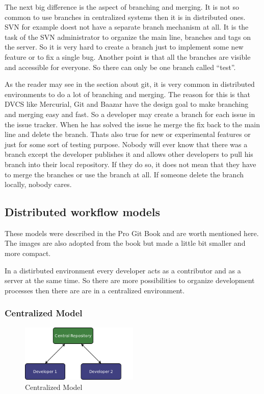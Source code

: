 The next big difference is the aspect of branching and merging. It is not so common to use branches 
in centralized systems then it is in distributed ones. SVN for example doest not have a separate branch 
mechanism at all. \cite[Apache\_Subversion\#Tag- und Branchkonzept]{wikipedia}
It is the task of the SVN administrator to organize the main line, branches and tags on the server. 
So it is very hard to create a branch just to implement some new feature or to fix a single bug. Another 
point is that all the branches are visible and accessible for everyone. So there can only 
be one branch called “test”.

As the reader may see in the section about git, it is very common in distributed environments to 
do a lot of branching and merging. The reason for this is that DVCS like Mercurial, Git and Baazar 
have the design goal to make branching and merging easy and fast. So a developer may create a branch 
for each issue in the issue tracker. When he has solved the issue he merge the fix back to the main 
line and delete the branch. Thats also true for new or experimental features or just for some sort 
of testing purpose. Nobody will ever know that there was a branch except the developer publishes 
it and allows other developers to pull his branch into their local repository. If they do so, it 
does not mean that they have to merge the branches or use the branch at all. If someone delete 
the branch locally, nobody cares.


\subsection{Distributed workflow models}

These models were described in the Pro Git Book \cite[Chapter 5.1]{gitpro2009} and are 
worth mentioned here. The images are also adopted from the book but made a little bit smaller and more compact.

In a distirbuted environment every developer acts as a contributor and as a server at the same time. So there are more 
possibilities to organize development processes then there are are in a centralized environment.


\subsubsection{Centralized Model}

\begin{figure}[ht]
  \centering
  \includegraphics[width=0.5\textwidth]{img/Mod_Central}
  \caption{Centralized Model}
  \label{fig:mod_centralized} 
\end{figure}

